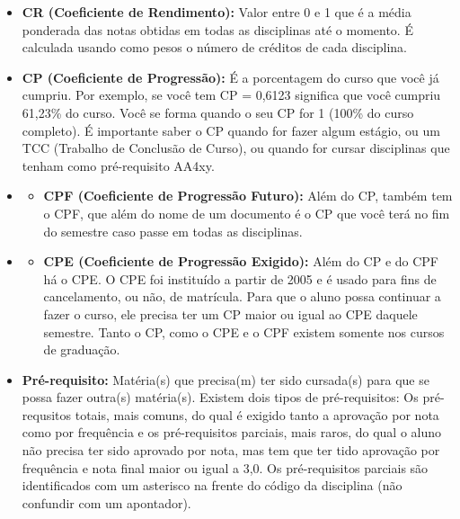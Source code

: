 \begin{itemize}
\item  \textbf{CR (Coeficiente de Rendimento):} Valor entre 0 e 1 que é a média ponderada das notas obtidas em todas as disciplinas até o momento. É calculada usando como pesos o número de créditos de cada disciplina.
\end{itemize}

\begin{itemize}
\item  \textbf{CP (Coeficiente de Progressão):} É a porcentagem do curso que você já cumpriu. Por exemplo, se você tem CP = 0,6123 significa que você cumpriu 61,23\% do curso. Você se forma quando o seu CP for 1 (100\% do curso completo). É importante saber o CP quando for fazer algum estágio, ou um TCC (Trabalho de Conclusão de Curso), ou quando for cursar disciplinas que tenham como pré-requisito AA4xy.
\end{itemize}

\begin{itemize}
\item \begin{itemize}
\item  \textbf{CPF (Coeficiente de Progressão Futuro):} Além do CP, também tem o CPF, que além do nome de um documento é o CP que você terá no fim do semestre caso passe em todas as disciplinas.
\end{itemize}
\end{itemize}

\begin{itemize}
\item \begin{itemize}
\item  \textbf{CPE (Coeficiente de Progressão Exigido):} Além do CP e do CPF há o CPE. O CPE foi instituído a partir de 2005 e é usado para fins de cancelamento, ou não, de matrícula. Para que o aluno possa continuar a fazer o curso, ele precisa ter um CP maior ou igual ao CPE daquele semestre. Tanto o CP, como o CPE e o CPF existem somente nos cursos de graduação.
\end{itemize}
\end{itemize}

\begin{itemize}
\item  \textbf{Pré-requisito:} Matéria(s) que precisa(m) ter sido cursada(s) para que se possa fazer outra(s) matéria(s). Existem dois tipos de pré-requisitos: Os pré-requsitos totais, mais comuns, do qual é exigido tanto a aprovação por nota como por frequência e os pré-requisitos parciais, mais raros, do qual o aluno não precisa ter sido aprovado por nota, mas tem que ter tido aprovação por frequência e nota final maior ou igual a 3,0. Os pré-requisitos parciais são identificados com um asterisco na frente do código da disciplina (não confundir com um apontador).
\end{itemize}

